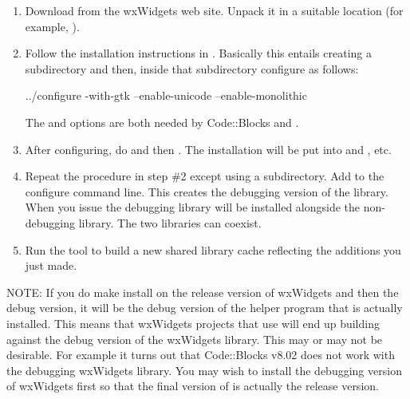 \begin{enumerate}

\item Download  from the wxWidgets web site. Unpack it in a
  suitable location (for example, ).

\item Follow the installation instructions in . Basically this entails
  creating a  subdirectory and then, inside that subdirectory configure as
  follows:

\begin{commands}
../configure -with-gtk --enable-unicode --enable-monolithic
\end{commands}

The  and  options are both needed by
Code::Blocks and \MapEditor.

\item After configuring, do  and then . The installation
  will be put into  and , etc.

\item Repeat the procedure in step \#2 except using a  subdirectory. Add
   to the configure command line. This creates the debugging version of
  the library. When you issue  the debugging library will be installed
  alongside the non-debugging library. The two libraries can coexist.

\item Run the  tool to build a new shared library cache reflecting the
  additions you just made.

\end{enumerate}

NOTE: If you do make install on the release version of wxWidgets and then the debug version, it
will be the debug version of the  helper program that is actually installed.
This means that wxWidgets projects that use  will end up building against the
debug version of the wxWidgets library. This may or may not be desirable. For example it turns
out that Code::Blocks v8.02 does not work with the debugging wxWidgets library. You may wish to
install the debugging version of wxWidgets first so that the final version of
 is actually the release version.

